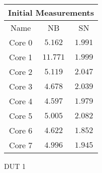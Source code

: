     \begin{tabular}{|| c | c | c ||}
    \hline
    \multicolumn{3}{||c||}{Initial Measurements} \\ [0.5ex] \hline\hline
    Name & NB & SN \\\hline
    Core 0 & $5.162$ & $1.991$ \\
    Core 1 & $11.771$ & $1.999$ \\
    Core 2 & $5.119$ & $2.047$ \\
    Core 3 & $4.678$ & $2.039$ \\
    Core 4 & $4.597$ & $1.979$ \\
    Core 5 & $5.005$ & $2.082$ \\
    Core 6 & $4.622$ & $1.852$ \\
    Core 7 & $4.996$ & $1.945$ \\\hline
    \end{tabular}
    \caption{DUT 1}
    \label{tab:initial-measurements-exp-3-dut-1}
